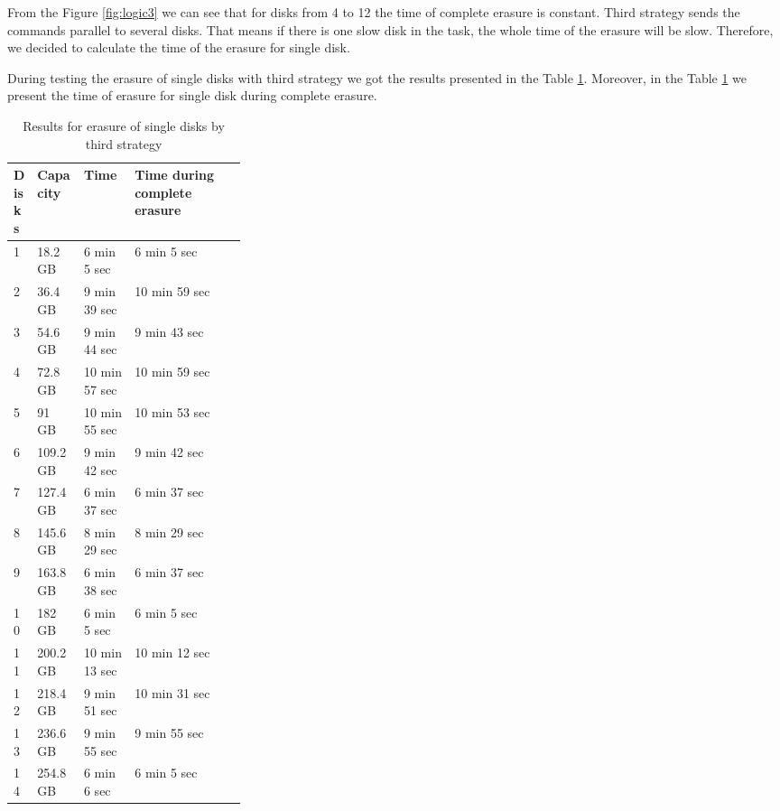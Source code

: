 From the Figure \ref{fig:logic3} we can see that for disks from 4 to 12 the time of complete erasure is constant. Third strategy sends the commands parallel to several disks. That means if there is one slow disk in the task, the whole time of the erasure will be slow. Therefore, we decided to calculate the time of the erasure for single disk.

\newpage
During testing the erasure of single disks with third strategy we got the results presented in the Table \ref{tbl:tbl_logic3_2}. Moreover, in the Table \ref{tbl:tbl_logic3_2} we present the time of erasure for single disk during complete erasure. 

\begin{table}[h!]
  \caption{Results for erasure of single disks by third strategy}
  \begin{center}
  \begin{tabularx}{\textwidth}{|p{0.1\linewidth}|p{0.2\linewidth}|X|X|X}
    \hline
    Disks & Capacity & Time & Time during complete erasure 
    \\ \hline
    1  & 18.2 GB  & 6 min 5 sec   & 6 min 5 sec    \\ \hline    
    2  & 36.4 GB  & 9 min 39 sec  & 10 min 59 sec  \\ \hline
    3  & 54.6 GB  & 9 min 44 sec  & 9 min 43 sec   \\ \hline
    4  & 72.8 GB  & 10 min 57 sec & 10 min 59 sec  \\ \hline
    5  & 91 GB    & 10 min 55 sec & 10 min 53 sec  \\ \hline
    6  & 109.2 GB & 9 min 42 sec  & 9 min 42 sec   \\ \hline    
    7  & 127.4 GB & 6 min 37 sec  & 6 min 37 sec   \\ \hline
    8  & 145.6 GB & 8 min 29 sec  & 8 min 29 sec   \\ \hline
    9  & 163.8 GB & 6 min 38 sec  & 6 min 37 sec   \\ \hline
    10 & 182 GB   & 6 min 5 sec   & 6 min 5 sec    \\ \hline    
    11 & 200.2 GB & 10 min 13 sec & 10 min 12 sec  \\ \hline    
    12 & 218.4 GB & 9 min 51 sec  & 10 min 31 sec  \\ \hline
    13 & 236.6 GB & 9 min 55 sec  & 9 min 55 sec   \\ \hline
    14 & 254.8 GB & 6 min 6 sec   & 6 min 5 sec    \\ \hline
  \end{tabularx}
  \label{tbl:tbl_logic3_2}
  \end{center}
\end{table}

